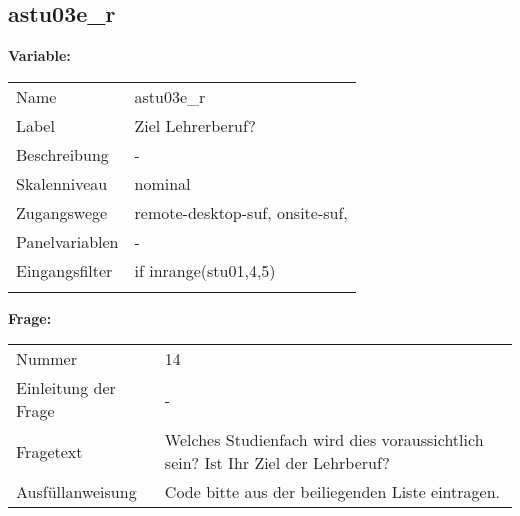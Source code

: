 	
	
	\subsection{astu03e\_r}
	\label{subSection:astu03e_r}

	\noindent\textbf{Variable:}\\
		\begin{tabular}{lL{11.3cm}}
			\label{tableVariable:astu03e_r}
			Name & astu03e\_r \\
			Label & Ziel Lehrerberuf? \\
			Beschreibung & - \\
			Skalenniveau & nominal \\
			Zugangswege &
				remote-desktop-suf,
				onsite-suf,
 \\
			Panelvariablen & -
			 \\
			Eingangsfilter & if inrange(stu01,4,5) \\
 \\
		\end{tabular}

		\vspace*{1 cm}
		\noindent\textbf{Frage:}\\
		\begin{tabular}{lL{11.3cm}}
			\label{tableQuestion:astu03e_r}
			Nummer & 14 \\
			Einleitung der Frage & - \\
			Fragetext & Welches Studienfach wird dies voraussichtlich sein?
Ist Ihr Ziel der Lehrberuf? \\
			Ausfüllanweisung & Code bitte aus der beiliegenden Liste eintragen. \\
		\end{tabular}





